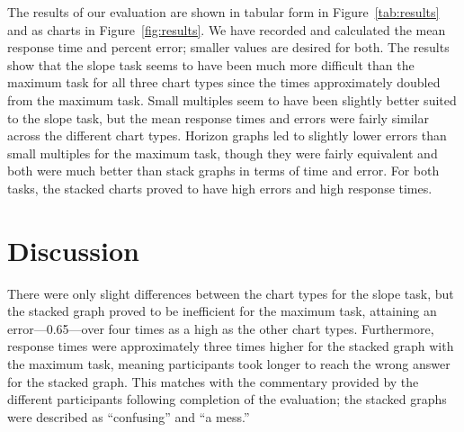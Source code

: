 \documentclass{article}
\begin{document}
The results of our evaluation are shown in tabular form in Figure~\ref{tab:results} and as charts in Figure~\ref{fig:results}.  We have recorded and calculated the mean response time and percent error; smaller values are desired for both.  The results show that the slope task seems to have been much more difficult than the maximum task for all three chart types since the times approximately doubled from the maximum task.  Small multiples seem to have been slightly better suited to the slope task, but the mean response times and errors were fairly similar across the different chart types.  Horizon graphs led to slightly lower errors than small multiples for the maximum task, though they were fairly equivalent and both were much better than stack graphs in terms of time and error.  For both tasks, the stacked charts proved to have high errors and high response times.

\section{Discussion}

There were only slight differences between the chart types for the slope task, but the stacked graph proved to be inefficient for the maximum task, attaining an error---0.65---over four times as a high as the other chart types.  Furthermore, response times were approximately three times higher for the stacked graph with the maximum task, meaning participants took longer to reach the wrong answer for the stacked graph.  This matches with the commentary provided by the different participants following completion of the evaluation; the stacked graphs were described as ``confusing'' and ``a mess.''
\end{document}
